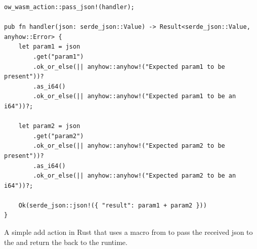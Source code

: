 \begin{listing}[ht]
    \begin{verbatim}
ow_wasm_action::pass_json!(handler);

pub fn handler(json: serde_json::Value) -> Result<serde_json::Value, anyhow::Error> {
    let param1 = json
        .get("param1")
        .ok_or_else(|| anyhow::anyhow!("Expected param1 to be present"))?
        .as_i64()
        .ok_or_else(|| anyhow::anyhow!("Expected param1 to be an i64"))?;

    let param2 = json
        .get("param2")
        .ok_or_else(|| anyhow::anyhow!("Expected param2 to be present"))?
        .as_i64()
        .ok_or_else(|| anyhow::anyhow!("Expected param2 to be an i64"))?;

    Ok(serde_json::json!({ "result": param1 + param2 }))
}
\end{verbatim}
    \caption{A simple add action in Rust that uses a macro from  to pass the received json to the  and return the  back to the runtime.}
    \label{listing:add-action-example}
\end{listing}

